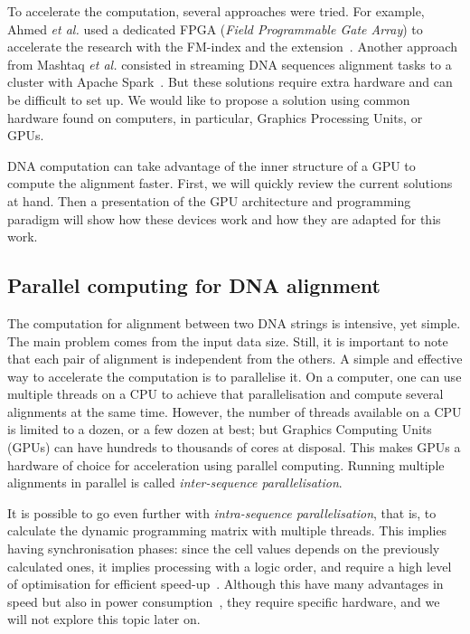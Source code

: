 To accelerate the computation, several approaches were tried. For example, Ahmed \emph{et al.} used a dedicated FPGA (\emph{Field Programmable Gate Array}) to accelerate the research with the FM-index and the extension~\cite{Ahmed:FPGA}. Another approach from Mashtaq \emph{et al.} consisted in streaming DNA sequences alignment tasks to a cluster with Apache Spark~\cite{Mushtaq:spark}. But these solutions require extra hardware and can be difficult to set up. We would like to propose a solution using common hardware found on computers, in particular, Graphics Processing Units, or GPUs.

DNA computation can take advantage of the inner structure of a GPU to compute the alignment faster. First, we will quickly review the current solutions at hand. Then a presentation of the GPU architecture and programming paradigm will show how these devices work and how they are adapted for this work.

\subsection{Parallel computing for DNA alignment}

The computation for alignment between two DNA strings is intensive, yet simple. The main problem comes from the input data size. Still, it is important to note that each pair of alignment is independent from the others. A simple and effective way to accelerate the computation is to parallelise it. On a computer, one can use multiple threads on a CPU to achieve that parallelisation and compute several alignments at the same time. However, the number of threads available on a CPU is limited to a dozen, or a few dozen at best; but Graphics Computing Units (GPUs) can have hundreds to thousands of cores at disposal. This makes GPUs a hardware of choice for acceleration using parallel computing. Running multiple alignments in parallel is called \emph{inter-sequence parallelisation}. 

It is possible to go even further with \emph{intra-sequence parallelisation}, that is, to calculate the dynamic programming matrix with multiple threads. This implies having synchronisation phases: since the cell values depends on the previously calculated ones, it implies processing with a logic order, and require a high level of optimisation for efficient speed-up~\cite{Houtgast:gpu-accelerated}. Although this have many advantages in speed but also in power consumption~\cite{Houtgast:power-efficiency}, they require specific hardware, and we will not explore this topic later on.

